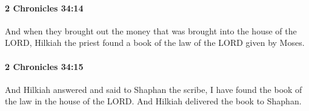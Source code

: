 		\paragraph{2 Chronicles 34:14} %
			\label{2CHRONICLES-34-14}

			And when they brought out the money that was brought into the house of the LORD, Hilkiah the priest found a book of the law of the LORD given by Moses.


		\paragraph{2 Chronicles 34:15} %
			\label{2CHRONICLES-34-15}

			And Hilkiah answered and said to Shaphan the scribe, I have found the book of the law in the house of the LORD. And Hilkiah delivered the book to Shaphan.


